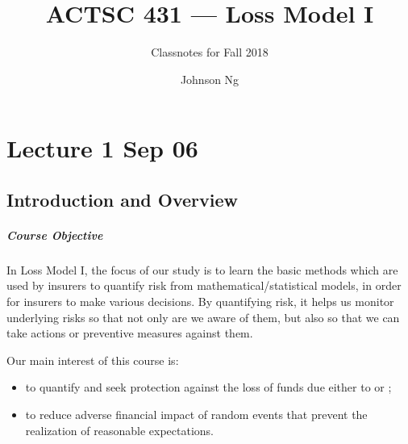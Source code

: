 \documentclass[notoc,notitlepage]{tufte-book}
\title{ACTSC 431 --- Loss Model I}
\author{Johnson Ng}
\subtitle{Classnotes for Fall 2018}
\begin{document}
\hypersetup{pageanchor=false}
\maketitle
\hypersetup{pageanchor=true}
\begin{fullwidth}
\tableofcontents
\end{fullwidth}

\newpage
\begin{fullwidth}
  \renewcommand{\listtheoremname}{\faBook\ \slshape List of Definitions}
  \listoftheorems[ignoreall,show={defn}]
\end{fullwidth}

\newpage 
\begin{fullwidth}
  \renewcommand{\listtheoremname}{\faCoffee\ \slshape List of Theorems}
  \listoftheorems[ignoreall,show={axiom,lemma,thm,crly,propo}]
\end{fullwidth}

\chapter{Lecture 1 Sep 06}%
\label{chp:lecture_1_sep_06}

\section{Introduction and Overview}%
\label{sec:introduction_and_overview}

\paragraph{Course Objective} In Loss Model I, the focus of our study is to learn the basic methods which are used by insurers to quantify risk from mathematical/statistical models, in order for insurers to make various decisions. By quantifying risk, it helps us monitor underlying risks so that not only are we aware of them, but also so that we can take actions or preventive measures against them.

Our main interest of this course is:
\begin{itemize}
  \item to quantify and seek protection against the loss of funds due either to  or ;
  \item to reduce adverse financial impact of random events that prevent the realization of reasonable expectations.
\end{itemize}
\end{document}
